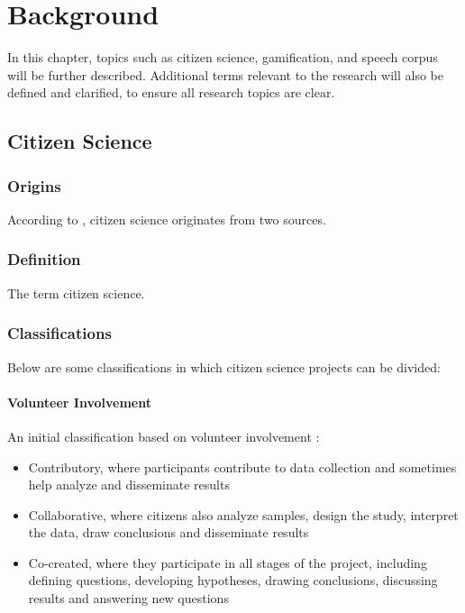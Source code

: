 \chapter{Background}

In this chapter, topics such as citizen science, gamification, and speech corpus will be further described. Additional terms relevant to the research will also be defined and clarified, to ensure all research topics are clear. 

\section{Citizen Science}

\subsection{Origins}

According to \cite{asd}, citizen science originates from two sources.

\subsection{Definition}

The term citizen science.

\subsection{Classifications}

Below are some classifications in which citizen science projects can be divided:

\subsubsection{Volunteer Involvement}

An initial classification based on volunteer involvement \cite{follett2015analysis}: 
\begin{itemize}
    \item Contributory, where participants contribute to data collection and sometimes help analyze and disseminate results
    \item Collaborative, where citizens also analyze samples, design the study, interpret the data, draw conclusions and disseminate results
    \item Co-created, where they participate in all stages of the project, including defining questions, developing hypotheses, drawing conclusions, discussing results and answering new questions
\end{itemize}


